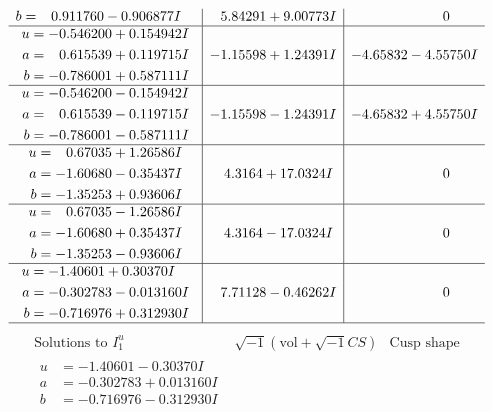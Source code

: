 \documentclass[1p]{elsarticle_modified}
\theoremstyle{definition}
\newcommand{\I}{\sqrt{-1}}
\begin{document}
$$\begin{array}{c|c|c}
\begin{aligned}
b &= \phantom{-}0.911760 - 0.906877 I\end{aligned}
 & \phantom{-}5.84291 + 9.00773 I & \phantom{-0.000000 } 0 \\ \hline\begin{aligned}
u &= -0.546200 + 0.154942 I \\
a &= \phantom{-}0.615539 + 0.119715 I \\
b &= -0.786001 + 0.587111 I\end{aligned}
 & -1.15598 + 1.24391 I & -4.65832 - 4.55750 I \\ \hline\begin{aligned}
u &= -0.546200 - 0.154942 I \\
a &= \phantom{-}0.615539 - 0.119715 I \\
b &= -0.786001 - 0.587111 I\end{aligned}
 & -1.15598 - 1.24391 I & -4.65832 + 4.55750 I \\ \hline\begin{aligned}
u &= \phantom{-}0.67035 + 1.26586 I \\
a &= -1.60680 - 0.35437 I \\
b &= -1.35253 + 0.93606 I\end{aligned}
 & \phantom{-}4.3164 + 17.0324 I & \phantom{-0.000000 } 0 \\ \hline\begin{aligned}
u &= \phantom{-}0.67035 - 1.26586 I \\
a &= -1.60680 + 0.35437 I \\
b &= -1.35253 - 0.93606 I\end{aligned}
 & \phantom{-}4.3164 - 17.0324 I & \phantom{-0.000000 } 0 \\ \hline\begin{aligned}
u &= -1.40601 + 0.30370 I \\
a &= -0.302783 - 0.013160 I \\
b &= -0.716976 + 0.312930 I\end{aligned}
 & \phantom{-}7.71128 - 0.46262 I & \phantom{-0.000000 } 0\\
 \hline 
 \end{array}$$\newpage$$\begin{array}{c|c|c}  
\text{Solutions to }I^u_{1}& \I (\text{vol} + \sqrt{-1}CS) & \text{Cusp shape}\\
 \hline 
\begin{aligned}
u &= -1.40601 - 0.30370 I \\
a &= -0.302783 + 0.013160 I \\
b &= -0.716976 - 0.312930 I\end{aligned}

\end{array}$$
\end{document}
